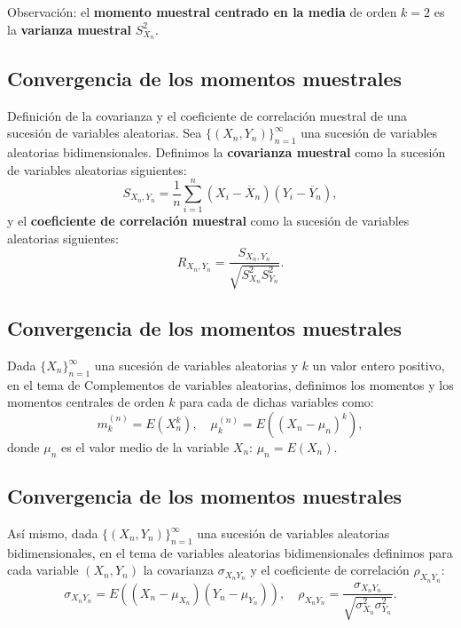 \documentclass[]{book}
\begin{document}
 Observación:
el \textbf{momento muestral centrado en la media} de orden \(k=2\) es la \textbf{varianza muestral} \(S_{X_n}^2\).

\hypertarget{convergencia-de-los-momentos-muestrales-2}{%
\subsection{Convergencia de los momentos muestrales}\label{convergencia-de-los-momentos-muestrales-2}}

 Definición de la covarianza y el coeficiente de correlación muestral de una sucesión de variables aleatorias.
Sea \(\{(X_n,Y_n)\}_{n=1}^\infty\) una sucesión de variables aleatorias bidimensionales. Definimos la \textbf{covarianza muestral} como la sucesión de variables aleatorias siguientes:
\[
S_{X_n,Y_n} = \frac{1}{n}\sum_{i=1}^n (X_i-\overline{X}_n)(Y_i-\overline{Y}_n),
\]
y el \textbf{coeficiente de correlación muestral} como la sucesión de variables aleatorias siguientes:
\[
R_{X_n,Y_n}=\frac{S_{X_n,Y_n}}{\sqrt{S_{X_n}^2 S_{Y_n}^2}}.
\]

\hypertarget{convergencia-de-los-momentos-muestrales-3}{%
\subsection{Convergencia de los momentos muestrales}\label{convergencia-de-los-momentos-muestrales-3}}

Dada \(\{X_n\}_{n=1}^\infty\) una sucesión de variables aleatorias y \(k\) un valor entero positivo, en el tema de Complementos de variables aleatorias, definimos los momentos y los momentos centrales de orden \(k\) para cada de dichas variables como:
\[
m_k^{(n)} = E\left(X_n^k\right),\quad\mu_k^{(n)}=E\left(\left(X_n-\mu_n\right)^k\right),
\]
donde \(\mu_n\) es el valor medio de la variable \(X_n\): \(\mu_n = E(X_n)\).

\hypertarget{convergencia-de-los-momentos-muestrales-4}{%
\subsection{Convergencia de los momentos muestrales}\label{convergencia-de-los-momentos-muestrales-4}}

Así mismo, dada \(\{(X_n,Y_n)\}_{n=1}^\infty\) una sucesión de variables aleatorias bidimensionales, en el tema de variables aleatorias bidimensionales definimos para cada variable \((X_n,Y_n)\) la covarianza \(\sigma_{X_nY_n}\) y el coeficiente de correlación \(\rho_{X_nY_n}\):
\[
\sigma_{X_nY_n}=E((X_n-\mu_{X_n})(Y_n-\mu_{Y_n})),\quad \rho_{X_nY_n}=\frac{\sigma_{X_nY_n}}{\sqrt{\sigma_{X_n}^2\sigma_{Y_n}^2}}.
\]
\end{document}
